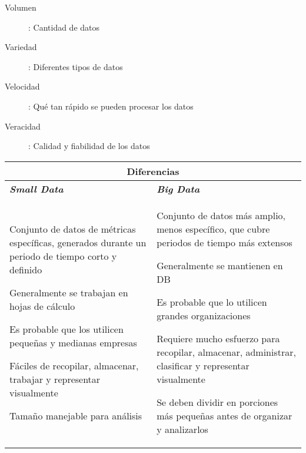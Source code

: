 \begin{itemize}
{\begin{itemize}
{        \begin{description}
            \item[Volumen] : Cantidad de datos
            \item[Variedad] : Diferentes tipos de datos
            \item[Velocidad] : Qué tan rápido se pueden procesar los datos
            \item[Veracidad] : Calidad y fiabilidad de los datos
        \end{description}}
    \end{itemize}}
\end{itemize}

\begin{table}
    \centering
    \begin{tabular}{|p{7cm}|p{7cm}|}
        \hline
        \multicolumn{2}{|c|}{Diferencias} \\
        \hline
        \textbf{\textit{Small Data}} & \textbf{\textit{Big Data}} \\
        \hline
        \begin{description}
            \item {Conjunto de datos de métricas específicas, generados durante un periodo de tiempo corto y definido}
            \item {Generalmente se trabajan en hojas de cálculo}
            \item {Es probable que los utilicen pequeñas y medianas empresas}
            \item {Fáciles de recopilar, almacenar, trabajar y representar visualmente}
            \item {Tamaño manejable para análisis}
        \end{description} & \begin{description}
            \item {Conjunto de datos más amplio, menos específico, que cubre periodos de tiempo más extensos}
            \item {Generalmente se mantienen en DB}
            \item {Es probable que lo utilicen grandes organizaciones}
            \item {Requiere mucho esfuerzo para recopilar, almacenar, administrar, clasificar y representar visualmente}
            \item {Se deben dividir en porciones más pequeñas antes de organizar y analizarlos}
        \end{description} \\
        \hline
    \end{tabular}
\end{table}
\newpage

